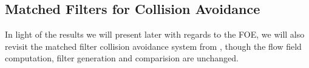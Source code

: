 \documentclass[a4paper,11pt,twoside,openright]{article}
\begin{document}






%

\subsection{Matched Filters for Collision Avoidance}\label{sec:offbg}
In light of the results we will present later with regards to the FOE,
we will also revisit the matched filter collision avoidance system
from \cite{Mitchell2018}, though the flow field computation, filter
generation and comparision are unchanged. 
\newline\par
\end{document}
